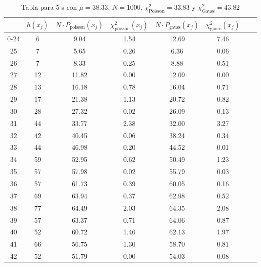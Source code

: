 \begin{center}
\begin{table}[H]
\caption{Tabla para 5 s con $\mu=38.33$, $N=1000$, $\chi^2_{\text{Poisson}}=33.83$  y $\chi^2_{\text{Gauss}}=43.82$}
\label{Tab:histo__5s}
\begin{tabular}{cccccccc}
\toprule
 & $h(x_j)$ & $N \cdot P_{\text{poisson}} (x_j)$ & $\chi^2_{\text{poisson}}(x_j)$ & $N \cdot P_{\text{gauss}} (x_j)$ & $\chi^2_{\text{gauss}}(x_j)$ \\
\midrule
0-24 & \num{    6} & \num{9.04} & \num{1.54} & \num{12.69} & \num{7.46} \\
25 & \num{    7} & \num{5.65} & \num{0.26} & \num{6.36} & \num{0.06} \\
26 & \num{    7} & \num{8.33} & \num{0.25} & \num{8.88} & \num{0.51} \\
27 & \num{   12} & \num{11.82} & \num{0.00} & \num{12.09} & \num{0.00} \\
28 & \num{   13} & \num{16.18} & \num{0.78} & \num{16.04} & \num{0.71} \\
29 & \num{   17} & \num{21.38} & \num{1.13} & \num{20.72} & \num{0.82} \\
30 & \num{   28} & \num{27.32} & \num{0.02} & \num{26.09} & \num{0.13} \\
31 & \num{   44} & \num{33.77} & \num{2.38} & \num{32.00} & \num{3.27} \\
32 & \num{   42} & \num{40.45} & \num{0.06} & \num{38.24} & \num{0.34} \\
33 & \num{   44} & \num{46.98} & \num{0.20} & \num{44.52} & \num{0.01} \\
34 & \num{   59} & \num{52.95} & \num{0.62} & \num{50.49} & \num{1.23} \\
35 & \num{   57} & \num{57.98} & \num{0.02} & \num{55.79} & \num{0.03} \\
36 & \num{   57} & \num{61.73} & \num{0.39} & \num{60.05} & \num{0.16} \\
37 & \num{   69} & \num{63.94} & \num{0.37} & \num{62.98} & \num{0.52} \\
38 & \num{   77} & \num{64.49} & \num{2.03} & \num{64.35} & \num{2.08} \\
39 & \num{   57} & \num{63.37} & \num{0.71} & \num{64.06} & \num{0.87} \\
40 & \num{   52} & \num{60.72} & \num{1.46} & \num{62.13} & \num{1.97} \\
41 & \num{   66} & \num{56.75} & \num{1.30} & \num{58.70} & \num{0.81} \\
42 & \num{   52} & \num{51.79} & \num{0.00} & \num{54.03} & \num{0.08} \\

\end{tabular}
\end{table}
\end{center}
